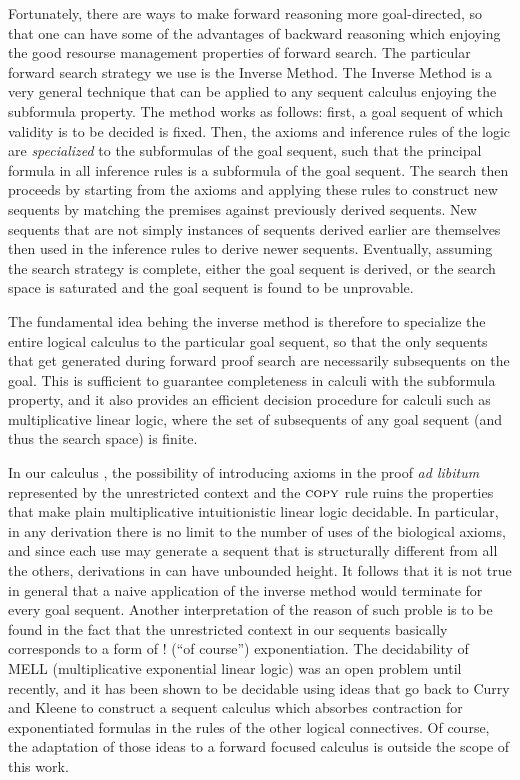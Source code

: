 Fortunately, there are ways to make forward reasoning more goal-directed, so
that one can have some of the advantages of backward reasoning which enjoying
the good resourse management properties of forward search.  The particular
forward search strategy we use is the Inverse Method. The Inverse Method is a
very general technique that can be applied to any sequent calculus enjoying the
subformula property. The method works as follows: first, a goal sequent of which
validity is to be decided is fixed. Then, the axioms and inference rules of the
logic are \emph{specialized} to the subformulas of the goal sequent, such that
the principal formula in all inference rules is a subformula of the goal
sequent. The search then proceeds by starting from the axioms and applying these
rules to construct new sequents by matching the premises against previously
derived sequents. New sequents that are not simply instances of sequents derived
earlier are themselves then used in the inference rules to derive newer
sequents. Eventually, assuming the search strategy is complete, either the goal
sequent is derived, or the search space is saturated and the goal sequent is
found to be unprovable.

The fundamental idea behing the inverse method is therefore to specialize the
entire logical calculus to the particular goal sequent, so that the only
sequents that get generated during forward proof search are necessarily
subsequents on the goal. This is sufficient to guarantee completeness in calculi
with the subformula property, and it also provides an efficient decision
procedure for calculi such as multiplicative linear logic, where the set of
subsequents of any goal sequent (and thus the search space) is finite.

In our calculus \zss{}, the possibility of introducing axioms in the proof
\emph{ad libitum} represented by the unrestricted context and the $\textsc{copy}$
rule ruins the properties that make plain multiplicative intuitionistic linear
logic decidable. In particular, in any derivation there is no limit to the
number of uses of the biological axioms, and since each use may generate a
sequent that is structurally different from all the others, derivations in
\zss{} can have unbounded height.  It follows that it is not true in general
that a naive application of the inverse method would terminate for every goal
sequent. Another interpretation of the reason of such proble is to be found in
the fact that the unrestricted context in our sequents basically corresponds to
a form of ! (``of course'') exponentiation. The decidability of MELL
(multiplicative exponential linear logic) was an open problem until recently,
and it has been shown to be decidable using ideas that go back to Curry and
Kleene to construct a sequent calculus which absorbes contraction for
exponentiated formulas in the rules of the other logical connectives. Of course,
the adaptation of those ideas to a forward focused calculus is outside the scope
of this work.

